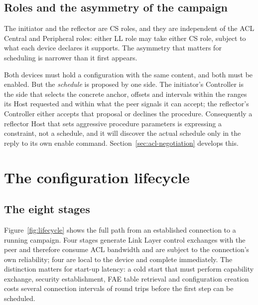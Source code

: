 \documentclass[11pt,a4paper]{article}
\begin{document}
\subsection{Roles and the asymmetry of the campaign}

The initiator and the reflector are CS roles, and they are independent of the ACL Central and
Peripheral roles: either LL role may take either CS role, subject to what each device declares it
supports. The asymmetry that matters for scheduling is narrower than it first appears.

Both devices must hold a configuration with the same content, and both must be enabled. But the
\emph{schedule} is proposed by one side. The initiator's Controller is the side that selects the
concrete anchor, offsets and intervals within the ranges its Host requested and within what the peer
signals it can accept; the reflector's Controller either accepts that proposal or declines the
procedure. Consequently a reflector Host that sets aggressive procedure parameters is expressing a
constraint, not a schedule, and it will discover the actual schedule only in the reply to its own
enable command. Section~\ref{sec:acl-negotiation} develops this.

\section{The configuration lifecycle}
\label{sec:config}

\subsection{The eight stages}

Figure~\ref{fig:lifecycle} shows the full path from an established connection to a running campaign.
Four stages generate Link Layer control exchanges with the peer and therefore consume ACL bandwidth
and are subject to the connection's own reliability; four are local to the device and complete
immediately. The distinction matters for start-up latency: a cold start that must perform capability
exchange, security establishment, FAE table retrieval and configuration creation costs several
connection intervals of round trips before the first step can be scheduled.
\end{document}
